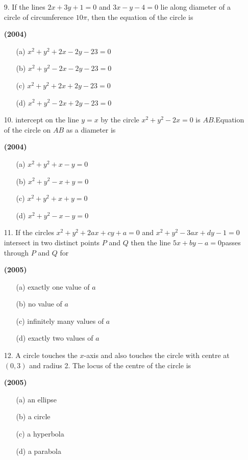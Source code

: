 \documentclass[journal,12pt,twocolumn]{IEEEtran}
\theoremstyle{remark}
\begin{document}
\begin{enumerate}
\item[9.]If the lines $2x+3y+1=0$ and $3x-y-4=0$ lie along diameter of a circle of circumference $10\pi$, then the equation of the circle is 

\hfill{\textbf{(2004)}}

\begin{enumerate}
\item[(a)] $x^2+y^2+2x-2y-23=0$
\item[(b)] $x^2+y^2-2x-2y-23=0$
\item[(c)] $x^2+y^2+2x+2y-23=0$
\item[(d)] $x^2+y^2-2x+2y-23=0$
\end{enumerate}
\end{enumerate}
\begin{enumerate}
\item[10.]intercept on the line $y=x$ by the circle $x^2+y^2-2x=0$ is $AB$.Equation of the circle on $AB$ as a diameter is 

\hfill{\textbf{(2004)}}

\begin{enumerate}
\item[(a)] $x^2+y^2+x-y=0$
\item[(b)] $x^2+y^2-x+y=0$
\item[(c)] $x^2+y^2+x+y=0$
\item[(d)] $x^2+y^2-x-y=0$
\end{enumerate}
\end{enumerate}
\begin{enumerate}
\item[11.]If the circles $x^2+y^2+2ax+cy+a=0$ and $x^2+y^2-3ax+dy-1=0$ intersect in two distinct points $P$ and $Q$ then the line $5x+by-a=0$passes through $P$ and $Q$ for

\hfill{\textbf{(2005)}}

\begin{enumerate}
\item[(a)] exactly one value of $a$
\item[(b)] no value of $a$
\item[(c)] infinitely many values of $a$
\item[(d)] exactly two values of $a$
\end{enumerate}
\end{enumerate}
\begin{enumerate}
\item[12.]A circle touches the $x$-axis and also touches the circle with centre at $(0,3)$ and radius 2. The locus of the centre of the circle is

\hfill{\textbf{(2005)}}

\begin{enumerate}
\item[(a)] an ellipse
\item[(b)] a circle 
\item[(c)] a hyperbola
\item[(d)] a parabola
\end{enumerate}
\end{enumerate}
\end{document}
